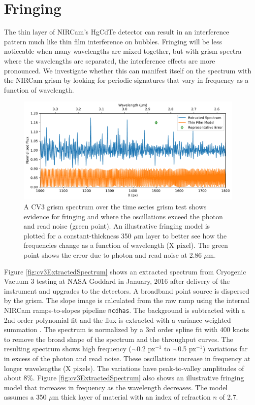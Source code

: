 \documentclass[]{aastex62}
\begin{document}
\section{Fringing}

The thin layer of NIRCam's HgCdTe detector can result in an interference pattern much like thin film interference on bubbles.
Fringing will be less noticeable when many wavelengths are mixed together, but with grism spectra where the wavelengths are separated, the interference effects are more pronounced.
We investigate whether this can manifest itself on the spectrum with the NIRCam grism by looking for periodic signatures that vary in frequency as a function of wavelength.

\begin{figure}[!hbtp]
\centering
\includegraphics[width=.99\columnwidth]{fringing_grism_cv3.pdf}
\caption{A CV3 grism spectrum over the time series grism test shows evidence for fringing and where the oscillations exceed the photon and read noise (green point).
An illustrative fringing model is plotted for a constant-thickness 350 $\mu$m layer to better see how the frequencies change as a function of wavelength (X pixel).
The green point shows the error due to photon and read noise at 2.86 $\mu$m.
}\label{fig:CV3GrismSpecFringing}
\end{figure}

Figure \ref{fig:cv3ExtractedSpectrum} shows an extracted spectrum from Cryogenic Vacuum 3 testing at NASA Goddard in January, 2016 after delivery of the instrument and upgrades to the detectors.
A broadband point source is dispersed by the grism.
The slope image is calculated from the raw ramp using the internal NIRCam ramps-to-slopes pipeline \texttt{ncdhas}.
The background is subtracted with a 2nd order polynomial fit and the flux is extracted with a variance-weighted summation \citep[e.g.][]{horne1986optimalE}.
The spectrum is normalized by a 3rd order spline fit with 400 knots to remove the broad shape of the spectrum and the throughput curves.
The resulting spectrum shows high frequency ($\sim$0.2 px$^{-1}$ to $\sim$0.5 px$^{-1}$) variations far in excess of the photon and read noise.
These oscillations increase in frequency at longer wavelengths (X pixels).
The variations have peak-to-valley amplitudes of about 8\%.
Figure \ref{fig:cv3ExtractedSpectrum} also shows an illustrative fringing model that increases in frequency as the wavelength decreases.
The model assumes a 350 $\mu$m thick layer of material with an index of refraction $n$ of 2.7.
\end{document}
